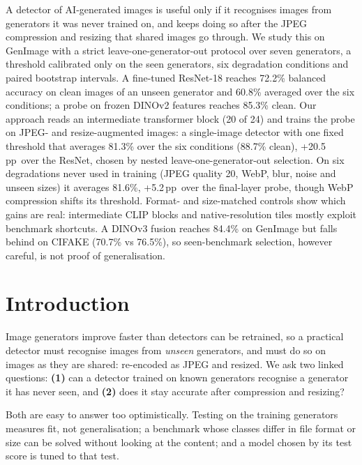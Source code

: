 \documentclass[10pt,a4paper]{article}
\renewenvironment{abstract}{\begin{center}\bfseries\abstractname\end{center}\vspace{-8pt}}{\par}
\newcommand{\pp}{\,pp}
\begin{document}
\begin{abstract}
\noindent
A detector of AI-generated images is useful only if it recognises images from generators it was never trained on, and keeps doing so after the JPEG compression and resizing that shared images go through. We study this on GenImage with a strict leave-one-generator-out protocol over seven generators, a threshold calibrated only on the seen generators, six degradation conditions and paired bootstrap intervals. A fine-tuned ResNet-18 reaches 72.2\% balanced accuracy on clean images of an unseen generator and 60.8\% averaged over the six conditions; a probe on frozen DINOv2 features reaches 85.3\% clean. Our approach reads an intermediate transformer block (20 of 24) and trains the probe on JPEG- and resize-augmented images: a single-image detector with one fixed threshold that averages 81.3\% over the six conditions (88.7\% clean), +20.5\pp\ over the ResNet, chosen by nested leave-one-generator-out selection. On six degradations never used in training (JPEG quality 20, WebP, blur, noise and unseen sizes) it averages 81.6\%, +5.2\pp\ over the final-layer probe, though WebP compression shifts its threshold. Format- and size-matched controls show which gains are real: intermediate CLIP blocks and native-resolution tiles mostly exploit benchmark shortcuts. A DINOv3 fusion reaches 84.4\% on GenImage but falls behind on CIFAKE (70.7\% vs 76.5\%), so seen-benchmark selection, however careful, is not proof of generalisation.
\end{abstract}

\section{Introduction}
Image generators improve faster than detectors can be retrained, so a practical detector must recognise images from \emph{unseen} generators, and must do so on images as they are shared: re-encoded as JPEG and resized. We ask two linked questions: \textbf{(1)} can a detector trained on known generators recognise a generator it has never seen, and \textbf{(2)} does it stay accurate after compression and resizing?

Both are easy to answer too optimistically. Testing on the training generators measures fit, not generalisation; a benchmark whose classes differ in file format or size can be solved without looking at the content; and a model chosen by its test score is tuned to that test.
\end{document}
